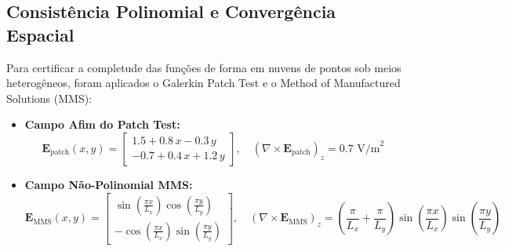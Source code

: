 \documentclass[11pt,a4paper]{article}
\begin{document}
\subsection{Consist\^encia Polinomial e Converg\^encia Espacial}
Para certificar a completude das fun\c{c}\~oes de forma em nuvens de pontos sob meios heterog\^eneos, foram aplicados o Galerkin Patch Test e o Method of Manufactured Solutions (MMS):
\begin{itemize}
  \item \textbf{Campo Afim do Patch Test:}
  \begin{equation}
  \mathbf{E}_{\mathrm{patch}}(x, y) = \begin{bmatrix} 1.5 + 0.8\,x - 0.3\,y \\ -0.7 + 0.4\,x + 1.2\,y \end{bmatrix}, \quad (\nabla \times \mathbf{E}_{\mathrm{patch}})_z = 0.7\text{ V/m}^2
  \end{equation}
  \item \textbf{Campo N\~ao-Polinomial MMS:}
  \begin{equation}
  \mathbf{E}_{\mathrm{MMS}}(x, y) = \begin{bmatrix} \sin\!\left(\frac{\pi x}{L_x}\right)\cos\!\left(\frac{\pi y}{L_y}\right) \\ -\cos\!\left(\frac{\pi x}{L_x}\right)\sin\!\left(\frac{\pi y}{L_y}\right) \end{bmatrix}, \quad (\nabla \times \mathbf{E}_{\mathrm{MMS}})_z = \left(\frac{\pi}{L_x} + \frac{\pi}{L_y}\right)\sin\!\left(\frac{\pi x}{L_x}\right)\sin\!\left(\frac{\pi y}{L_y}\right)
  \end{equation}
\end{itemize}

\begin{table}[H]
\centering
\caption{Desempenho de interpola\c{c}\~ao do VNMM 2D em dom\'inio bimaterial com nuvem de pontos.}
\label{tab:interp}
\end{table}
\end{document}
